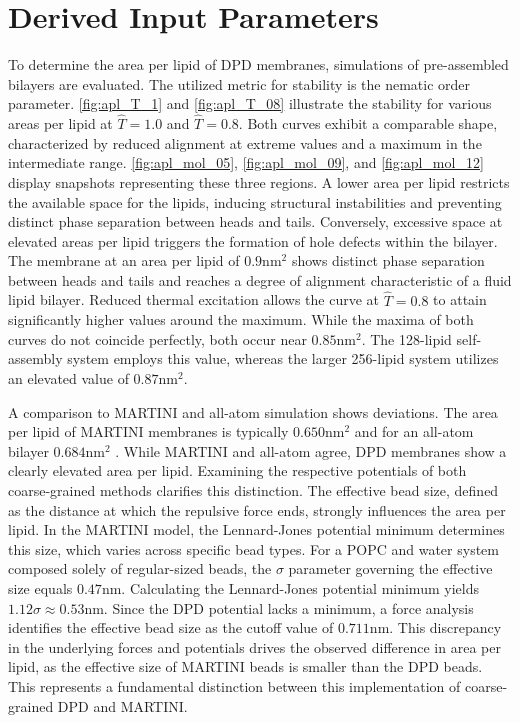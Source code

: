 \documentclass[
    11pt,
    a4paper,
    oneside,        %
    BCOR=10mm,      %
    parskip=half,   %
    listof=nototoc,   %
    bibliography=totoc %
]{scrreprt}
\begin{document}
\section{Derived Input Parameters}

To determine the area per lipid of DPD membranes, simulations of pre-assembled bilayers are evaluated. The utilized metric for stability is the nematic order parameter. \cref{fig:apl_T_1} and \cref{fig:apl_T_08} illustrate the stability for various areas per lipid at $\hat{T}=1.0$ and $\hat{T}=0.8$. Both curves exhibit a comparable shape, characterized by reduced alignment at extreme values and a maximum in the intermediate range. \cref{fig:apl_mol_05}, \cref{fig:apl_mol_09}, and \cref{fig:apl_mol_12} display snapshots representing these three regions. A lower area per lipid restricts the available space for the lipids, inducing structural instabilities and preventing distinct phase separation between heads and tails. Conversely, excessive space at elevated areas per lipid triggers the formation of hole defects within the bilayer. The membrane at an area per lipid of $0.9\si{\nano\m\squared}$ shows distinct phase separation between heads and tails and reaches a degree of alignment characteristic of a fluid lipid bilayer. Reduced thermal excitation allows the curve at $\hat{T}=0.8$ to attain significantly higher values around the maximum. While the maxima of both curves do not coincide perfectly, both occur near $0.85\si{\nano\m\squared}$. The 128-lipid self-assembly system employs this value, whereas the larger 256-lipid system utilizes an elevated value of $0.87\si{\nano\m\squared}$.

A comparison to MARTINI and all-atom simulation shows deviations. The area per lipid of MARTINI membranes is typically $0.650\si{\nano\m\squared}$ \cite{lipidome_paper} and for an all-atom bilayer $0.684\si{\nano\m\squared}$ \cite{all_atom_popc}. While MARTINI and all-atom agree, DPD membranes show a clearly elevated area per lipid. Examining the respective potentials of both coarse-grained methods clarifies this distinction. The effective bead size, defined as the distance at which the repulsive force ends, strongly influences the area per lipid. In the MARTINI model, the Lennard-Jones potential minimum determines this size, which varies across specific bead types. For a POPC and water system composed solely of regular-sized beads, the $\sigma$ parameter governing the effective size equals $0.47\si{\nano\m}$. Calculating the Lennard-Jones potential minimum yields $1.12\sigma\approx0.53\si{\nano\m}$. Since the DPD potential lacks a minimum, a force analysis identifies the effective bead size as the cutoff value of $0.711\si{\nano\m}$. This discrepancy in the underlying forces and potentials drives the observed difference in area per lipid, as the effective size of MARTINI beads is smaller than the DPD beads. This represents a fundamental distinction between this implementation of coarse-grained DPD and MARTINI.
\end{document}
